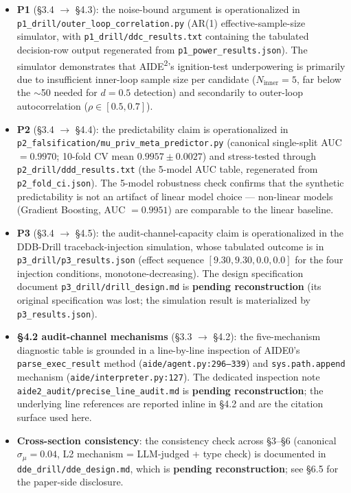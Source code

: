 \documentclass{article}
\theoremstyle{definition}
\begin{document}
\begin{itemize}
    \item \textbf{P1} (\S3.4 $\to$ \S4.3): the noise-bound argument is operationalized in \texttt{p1\_drill/outer\_loop\_correlation.py} (AR(1) effective-sample-size simulator, with \texttt{p1\_drill/ddc\_results.txt} containing the tabulated decision-row output regenerated from \texttt{p1\_power\_results.json}). The simulator demonstrates that AIDE\textsuperscript{2}'s ignition-test underpowering is primarily due to insufficient inner-loop sample size per candidate ($N_{\text{inner}} = 5$, far below the $\sim$50 needed for $d = 0.5$ detection) and secondarily to outer-loop autocorrelation ($\rho \in [0.5, 0.7]$).
    \item \textbf{P2} (\S3.4 $\to$ \S4.4): the predictability claim is operationalized in \texttt{p2\_falsification/mu\_priv\_meta\_predictor.py} (canonical single-split AUC $=0.9970$; 10-fold CV mean $0.9957\pm0.0027$) and stress-tested through \texttt{p2\_drill/ddd\_results.txt} (the 5-model AUC table, regenerated from \texttt{p2\_fold\_ci.json}). The 5-model robustness check confirms that the synthetic predictability is not an artifact of linear model choice --- non-linear models (Gradient Boosting, AUC $=0.9951$) are comparable to the linear baseline.
    \item \textbf{P3} (\S3.4 $\to$ \S4.5): the audit-channel-capacity claim is operationalized in the DDB-Drill traceback-injection simulation, whose tabulated outcome is in \texttt{p3\_drill/p3\_results.json} (effect sequence $[9.30, 9.30, 0.0, 0.0]$ for the four injection conditions, monotone-decreasing). The design specification document \texttt{p3\_drill/drill\_design.md} is \textbf{pending reconstruction} (its original specification was lost; the simulation result is materialized by \texttt{p3\_results.json}).
    \item \textbf{\S4.2 audit-channel mechanisms} (\S3.3 $\to$ \S4.2): the five-mechanism diagnostic table is grounded in a line-by-line inspection of AIDE0's \texttt{parse\_exec\_result} method (\texttt{aide/agent.py:296--339}) and \texttt{sys.path.append} mechanism (\texttt{aide/interpreter.py:127}). The dedicated inspection note \texttt{aide2\_audit/precise\_line\_audit.md} is \textbf{pending reconstruction}; the underlying line references are reported inline in \S4.2 and are the citation surface used here.
    \item \textbf{Cross-section consistency}: the consistency check across \S3--\S6 (canonical $\sigma_\mu = 0.04$, L2 mechanism = LLM-judged + type check) is documented in \texttt{dde\_drill/dde\_design.md}, which is \textbf{pending reconstruction}; see \S6.5 for the paper-side disclosure.
\end{itemize}
\end{document}

